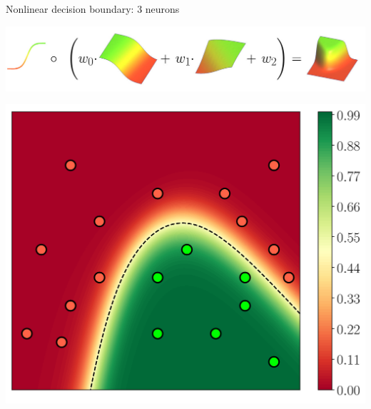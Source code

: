 \documentclass[UKenglish,aspectratio=169]{beamer}
\begin{document}
\begin{frame}{Nonlinear decision boundary: 3 neurons}
\centerline{\includegraphics[width=.9\linewidth]{../manuscript/img/3n.jpg}}
\pause
\centerline{\includegraphics[width=.38\linewidth]{../manuscript/img/neural.png}}
\end{frame}
\end{document}
